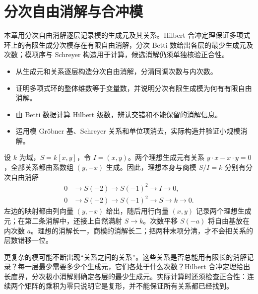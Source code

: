 
\chapter{分次自由消解与合冲模}
\label{b3:ch:21}

\begin{chapterabstract}
	本章用分次自由消解逐层记录模的生成元及其关系。Hilbert 合冲定理保证多项式环上的有限生成分次模存在有限自由消解，分次 Betti 数给出各层的最少生成元及次数；模项序与 Schreyer 构造用于计算，候选消解仍须单独核验正合性。
\end{chapterabstract}

\begin{learninggoals}
	\begin{itemize}
		\item 从生成元和关系逐层构造分次自由消解，分清同调次数与内次数。
		\item 证明多项式环的整体维数等于变量数，并说明分次有限生成模为何有有限自由消解。
		\item 由 Betti 数据计算 Hilbert 级数，辨认交错和不能保留的消解信息。
		\item 运用模 Gröbner 基、Schreyer 关系和单位项消去，实际构造并验证小规模消解。
	\end{itemize}
\end{learninggoals}

设 \(k\) 为域，\(S=k[x,y]\)，令 \(I=(x,y)\)。两个理想生成元有关系 \(y\cdot x-x\cdot y=0\)，全部关系都由系数组 \((y,-x)\) 生成。因此，理想本身与商模 \(S/I=k\) 分别有分次自由消解
\[
	\begin{aligned}
		0&\longrightarrow S(-2)\longrightarrow S(-1)^2 \longrightarrow I\longrightarrow0,\\
		0&\longrightarrow S(-2)\longrightarrow S(-1)^2 \longrightarrow S\longrightarrow k\longrightarrow0.
	\end{aligned}
\]
左边的映射都由列向量 \((y,-x)\) 给出，随后用行向量 \((x,y)\) 记录两个理想生成元；在第二条消解中，还接上自然满射 \(S\to k\)。次数平移 \(S(-a)\) 将自由基放在内次数 \(a\)。理想的消解长一，商模的消解长二；把两种末项分清，才不会把关系的层数错移一位。

\ProseParagraphBreak

更复杂的模可能不断出现“关系之间的关系”。这些关系是否总能用有限长的消解记录？每一层最少需要多少个生成元，它们各处于什么次数？Hilbert 合冲定理给出长度界，分次极小消解则确定各层的最少生成元。实际计算时还须检查正合性：连续两个矩阵的乘积为零只说明它是复形，并不能保证所有关系都已经找到。

